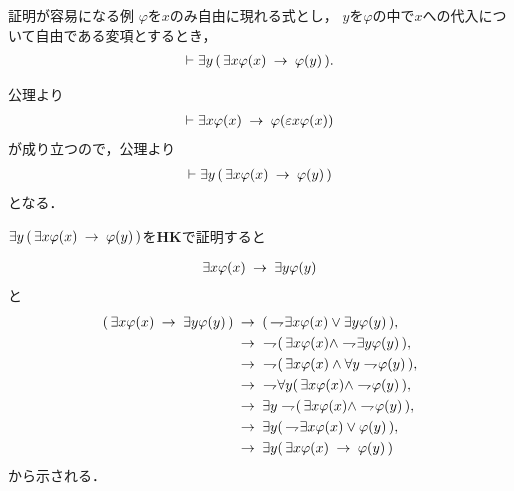 \newpage
	\begin{itembox}[l]{証明が容易になる例}
		$\varphi$を$x$のみ自由に現れる式とし，
		$y$を$\varphi$の中で$x$への代入について自由である変項とするとき，
		\begin{align}
			\vdash \exists y\, (\, \exists x \varphi(x) \hspace{0.25em}\rightarrow\hspace{0.25em} \varphi(y)\, ).
		\end{align}
	\end{itembox}
	
	\begin{sketch}
		公理より
		\begin{align}
			\vdash \exists x \varphi(x) \hspace{0.25em}\rightarrow\hspace{0.25em} \varphi(\varepsilon x \varphi(x))
		\end{align}
		が成り立つので，公理より
		\begin{align}
			\vdash \exists y\, (\, \exists x \varphi(x) \hspace{0.25em}\rightarrow\hspace{0.25em} \varphi(y)\, )
		\end{align}
		となる．
		\QED
	\end{sketch}

\newpage
	$\exists y\, (\, \exists x \varphi(x) \hspace{0.25em}\rightarrow\hspace{0.25em} \varphi(y)\, )$を{\bf HK}で証明すると
	
	\begin{align}
		\exists x \varphi(x) \hspace{0.25em}\rightarrow\hspace{0.25em} \exists y \varphi(y)
	\end{align}
	と
	\begin{align}
		(\, \exists x \varphi(x) \rarrow \exists y \varphi(y) \, )
		&\rarrow (\, \negation \exists x \varphi(x) \vee \exists y \varphi(y) \, ), \\
		&\rarrow\ \negation (\, \exists x \varphi(x) \wedge \negation \exists y \varphi(y) \, ), \\
		&\rarrow\ \negation (\, \exists x \varphi(x) \wedge \forall y \negation \varphi(y) \, ), \\
		&\rarrow\ \negation \forall y (\, \exists x \varphi(x) \wedge \negation \varphi(y) \, ), \\
		&\rarrow \exists y \negation (\, \exists x \varphi(x) \wedge \negation \varphi(y) \, ), \\
		&\rarrow \exists y (\, \negation \exists x \varphi(x) \vee \varphi(y) \, ), \\
		&\rarrow \exists y (\, \exists x \varphi(x) \rarrow \varphi(y) \, )
	\end{align}
	から示される．